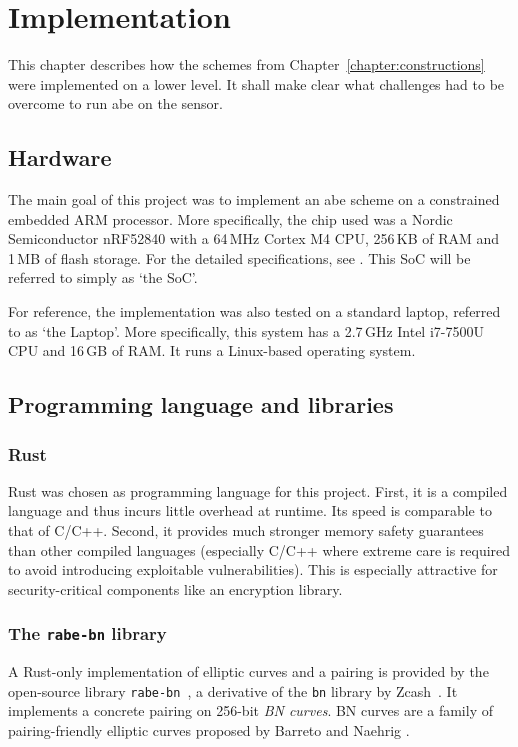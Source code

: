 \chapter{Implementation}

This chapter describes how the schemes from Chapter~\ref{chapter:constructions} were implemented on a lower level.
It shall make clear what challenges had to be overcome to run \acrshort{abe} on the sensor.

\section{Hardware}

The main goal of this project was to implement an \acrshort{abe} scheme on a constrained embedded ARM processor.
More specifically, the chip used was a Nordic Semiconductor nRF52840 with a 64\,MHz Cortex M4 CPU, 256\,KB of RAM and 1\,MB of flash storage.
For the detailed specifications, see \cite{noauthor_nrf52840_nodate}.
This SoC will be referred to simply as `the SoC'.

For reference, the implementation was also tested on a standard laptop, referred to as `the Laptop'.
More specifically, this system has a 2.7\,GHz Intel i7-7500U CPU and 16\,GB of RAM.
It runs a Linux-based operating system.

\section{Programming language and libraries}

\subsection*{Rust}

Rust was chosen as programming language for this project.
First, it is a compiled language and thus incurs little overhead at runtime. Its speed is comparable to that of C/C++.
Second, it provides much stronger memory safety guarantees than other compiled languages (especially C/C++ where extreme care is required to avoid introducing exploitable vulnerabilities).
This is especially attractive for security-critical components like an encryption library.

\subsection*{The \texttt{rabe-bn} library}

A Rust-only implementation of elliptic curves and a pairing is provided by the open-source library \texttt{rabe-bn}~\cite{bowe_bn_2016}, a derivative of the \texttt{bn} library by Zcash~\cite{bowe_bn_2016}.
It implements a concrete pairing on 256-bit \emph{BN curves}.
BN curves are a family of pairing-friendly elliptic curves proposed by Barreto and Naehrig \cite{barreto_pairing-friendly_2006}.

